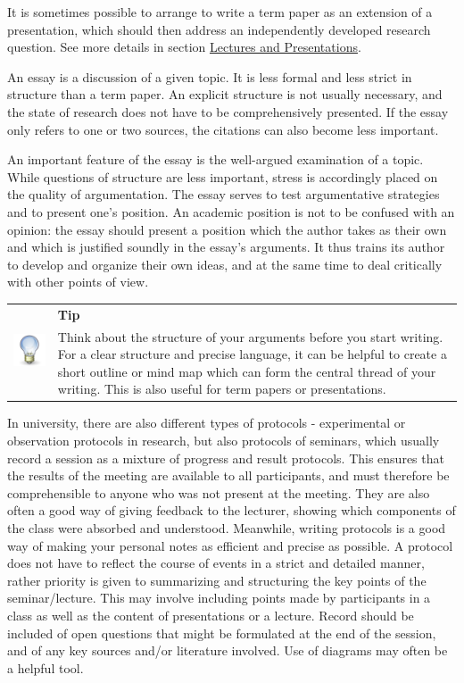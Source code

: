 \documentclass[
  english,
]{scrreprt}
\newlength{\iconwidth}
\newenvironment{displaybox}[2]{%
    \begin{center}
        \setlength\arrayrulewidth{0.75pt}%
        \arrayrulecolor{white}%
        \renewcommand{\arraystretch}{1.3}%
        \begin{tabular}{p{\iconwidth}p{\linewidth-4\tabcolsep-\iconwidth}}
            \multirow{2}{*}{#2}&\cellcolor{boxheadcol}\textbf{\sffamily\color{white}#1} \\%
            \hhline{~-}%
            &\cellcolor{boxcol}%
}{%
            \\
        \end{tabular}
        \arrayrulecolor{black}
    \end{center}
}
\newenvironment{Tip}{%
\begin{displaybox}{Tip}{\includegraphics[width=\iconwidth]{images/icon-tipp}}}%
{\end{displaybox}}
\begin{document}
It is sometimes possible to arrange to write a term paper as an extension of a presentation, which should then address an independently developed research question. See more details in section \hyperref[sec:presentations]{Lectures and Presentations}.

An essay is a discussion of a given topic. It is less formal and less strict in structure than a term paper. An explicit structure is not usually necessary, and the state of research does not have to be comprehensively presented. If the essay only refers to one or two sources, the citations can also become less important.

An important feature of the essay is the well-argued examination of a topic. While questions of structure are less important, stress is accordingly placed on the quality of argumentation. The essay serves to test argumentative strategies and to present one’s position. An academic position is not to be confused with an opinion: the essay should present a position which the author takes as their own and which is justified soundly in the essay’s arguments. It thus trains its author to develop and organize their own ideas, and at the same time to deal critically with other points of view.

\begin{Tip}

Think about the structure of your arguments before you start writing. For a clear structure and precise language, it can be helpful to create a short outline or mind map which can form the central thread of your writing. This is also useful for term papers or presentations.

\end{Tip}

In university, there are also different types of protocols - experimental or observation protocols in research, but also protocols of seminars, which usually record a session as a mixture of progress and result protocols. This ensures that the results of the meeting are available to all participants, and must therefore be comprehensible to anyone who was not present at the meeting. They are also often a good way of giving feedback to the lecturer, showing which components of the class were absorbed and understood. Meanwhile, writing protocols is a good way of making your personal notes as efficient and precise as possible. A protocol does not have to reflect the course of events in a strict and detailed manner, rather priority is given to summarizing and structuring the key points of the seminar/lecture. This may involve including points made by participants in a class as well as the content of presentations or a lecture. Record should be included of open questions that might be formulated at the end of the session, and of any key sources and/or literature involved. Use of diagrams may often be a helpful tool.
\end{document}
